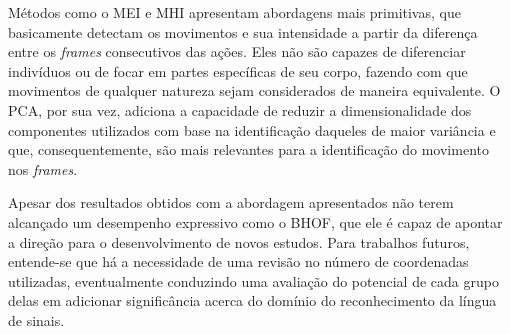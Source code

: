 Métodos como o MEI e MHI apresentam abordagens mais primitivas, que basicamente detectam os movimentos e sua intensidade a partir da diferença entre os \textit{frames} consecutivos das ações. Eles não são capazes de diferenciar indivíduos ou de focar em partes específicas de seu corpo, fazendo com que movimentos de qualquer natureza sejam considerados de maneira equivalente. O PCA, por sua vez, adiciona a capacidade de reduzir a dimensionalidade dos componentes utilizados com base na identificação daqueles de maior variância e que, consequentemente, são mais relevantes para a identificação do movimento nos \textit{frames}. 

Apesar dos resultados obtidos com a abordagem apresentados não terem alcançado um desempenho expressivo como o BHOF, que ele é capaz de apontar a direção para o desenvolvimento de novos estudos. Para trabalhos futuros, entende-se que há a necessidade de uma revisão no número de coordenadas utilizadas, eventualmente conduzindo uma avaliação do potencial de cada grupo delas em adicionar significância acerca do domínio do reconhecimento da língua de sinais.






